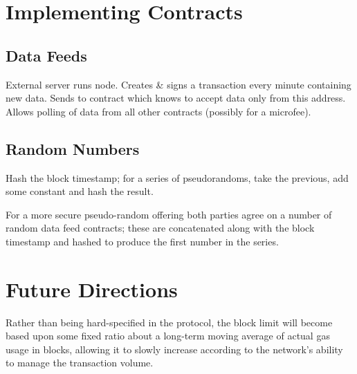 \documentclass[9pt,oneside]{amsart}
\makeatletter
\newcommand*\eg{e.g.\@\xspace}
\makeatother
\begin{document}
\begin{multicols}{2}
%

\section{Implementing Contracts}

\subsection{Data Feeds}

External server runs node. Creates \& signs a transaction every minute containing new data. Sends to contract which knows to accept data only from this address. Allows polling of data from all other contracts (possibly for a microfee).

\subsection{Random Numbers}

Hash the block timestamp; for a series of pseudorandoms, take the previous, add some constant and hash the result.

For a more secure pseudo-random offering both parties agree on a number of random data feed contracts; these are concatenated along with the block timestamp and hashed to produce the first number in the series.

\section{Future Directions} \label{ch:future}

Rather than being hard-specified in the protocol, the block limit will become based upon some fixed ratio about a long-term moving average of actual gas usage in blocks, allowing it to slowly increase according to the network's ability to manage the transaction volume.


\end{multicols}
\end{document}
